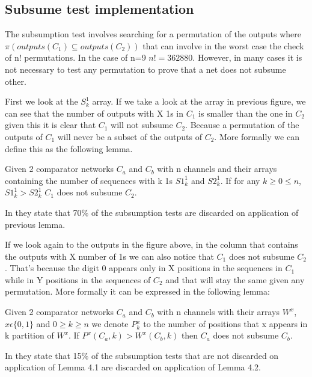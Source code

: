 \documentclass[../main.tex]{subfiles}
\begin{document}
	\subsection{Subsume test implementation}
	The subsumption test involves searching for a permutation of the outputs where $\pi(outputs(C_1) \subseteq outputs(C_2))$ that can involve in the worst case the check of n! permutations. In the case of n=9 $n! = 362880$. However, in many cases it is not necessary to test any permutation to prove that a net does not subsume other. 
	
	First we look at the $S^{1}_k$ array. If we take a look at the array in previous figure, we can see that the number of outputs with X 1s in $C_1$ is smaller than the one in $C_2$ given this it is clear that $C_1$ will not subsume $C_2$. Because a permutation of the outputs of $C_1$ will never be a subset of the outputs of $C_2$. More formally we can define this as the following lemma.
	
	\begin{lemma}
		Given 2 comparator networks $C_a$ and $C_b$ with n channels and their arrays containing the number of sequences with k 1s $S1^{1}_k$ and $S2^{1}_k$. If for any $k\geq 0 \leq n$, $S1^{1}_k > S2^{1}_k$ $C_1$ does not subsume $C_2$.
	\end{lemma}
	
	In \cite{sortingnineinputs} they state that 70\% of the subsumption tests are discarded on application of previous lemma.
	
	If we look again to the outputs in the figure above, in the column that contains the outputs with X number of 1s we can also notice that $C_1$ does not subsume $C_2$. That's because the digit 0 appears only in X positions in the sequences in $C_1$ while in Y positions in the sequences of $C_2$ and that will stay the same given any permutation. More formally it can be expressed in the following lemma:
	
	\begin{lemma}
	Given 2 comparator networks $C_a$ and $C_b$ with n channels with their arrays $W^x$, $x \epsilon \{0,1\}$ and $0\geq k \geq n$ we denote $P{^x_k}$ to the number of positions that x appears in k partition of $W^x$. If $P^x(C_a, k) > W^x(C_b, k)$ then $C_a$ does not subsume $C_b$.
	\end{lemma}

	In \cite{sortingnineinputs} they state that 15\% of the subsumption tests that are not discarded on application of Lemma 4.1 are discarded on application of Lemma 4.2.
	
\end{document}
